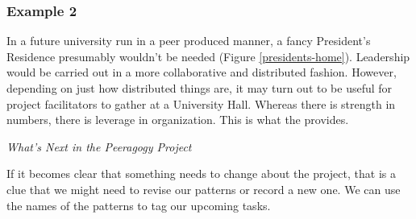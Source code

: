 \subsubsection*{Example 2}
In a future university run in a peer produced manner, a fancy
President's Residence presumably wouldn't be needed (Figure \ref{presidents-home}).  Leadership would
be carried out in a more collaborative and distributed fashion.
However, depending on just how distributed things are, it may turn out
to be useful for project facilitators to gather at a University Hall.
Whereas there is strength in numbers, there is leverage in
organization.  This is what the  provides.


\smallskip

\begin{framed}
\noindent
\emph{What's Next in the Peeragogy Project}
\begin{collectinmacro}{\RoadmapWN}{}{}
If it becomes clear that something needs to change about the project, that is a clue that we might need to revise our patterns or record a new one.  We can use the names of the patterns to tag our upcoming tasks.
\end{collectinmacro}
\RoadmapWN
\end{framed}



